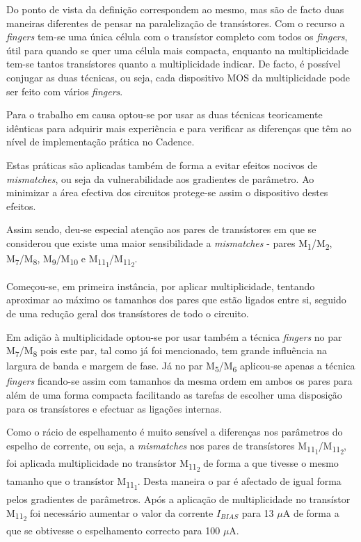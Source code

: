 \documentclass[11pt]{article}
\numberwithin{equation}{section}
\begin{document}
Do ponto de vista da definição correspondem ao mesmo, mas são de facto duas maneiras diferentes de pensar na paralelização de transístores. Com o recurso a \textit{fingers} tem-se uma única célula com o transístor completo com todos os \textit{fingers}, útil para quando se quer uma célula mais compacta, enquanto na multiplicidade tem-se tantos transístores quanto a multiplicidade indicar. De facto, é possível conjugar as duas técnicas, ou seja, cada dispositivo MOS da multiplicidade pode ser feito com vários \textit{fingers}.

Para o trabalho em causa optou-se por usar as duas técnicas teoricamente idênticas para adquirir mais experiência e para verificar as diferenças que têm ao nível de implementação prática no Cadence.

Estas práticas são aplicadas também de forma a evitar  efeitos nocivos de \textit{mismatches}, ou seja da vulnerabilidade aos gradientes de parâmetro. Ao minimizar a área efectiva dos circuitos protege-se assim o dispositivo destes efeitos.

Assim sendo, deu-se especial atenção aos pares de transístores em que se considerou que existe uma maior sensibilidade a \textit{mismatches} - pares M\textsubscript{1}/M\textsubscript{2}, M\textsubscript{7}/M\textsubscript{8}, M\textsubscript{9}/M\textsubscript{10} e M\textsubscript{11\textsubscript{1}}/M\textsubscript{11\textsubscript{2}}. 

Começou-se, em primeira instância, por aplicar multiplicidade, tentando aproximar ao máximo os tamanhos dos pares que estão ligados entre si, seguido de uma redução geral dos transístores de todo o circuito. 

Em adição à multiplicidade optou-se por usar também a técnica \textit{fingers} no par M\textsubscript{7}/M\textsubscript{8} pois este par, tal como já foi mencionado, tem grande influência na largura de banda e margem de fase. Já no par M\textsubscript{5}/M\textsubscript{6} aplicou-se apenas a técnica \textit{fingers} ficando-se assim com tamanhos da mesma ordem em ambos os pares para além de uma forma compacta facilitando as tarefas de escolher uma disposição para os transístores e efectuar as ligações internas.

Como o rácio de espelhamento é muito sensível a diferenças nos parâmetros do espelho de corrente, ou seja, a \textit{mismatches} nos pares de transístores M\textsubscript{11\textsubscript{1}}/M\textsubscript{11\textsubscript{2}}, foi aplicada multiplicidade no transístor M\textsubscript{11\textsubscript{2}} de forma a que tivesse o mesmo tamanho que o transístor M\textsubscript{11\textsubscript{1}}. Desta maneira o par é afectado de igual forma pelos gradientes de parâmetros. Após a aplicação de multiplicidade no transístor M\textsubscript{11\textsubscript{2}} foi necessário aumentar o valor da corrente $I_{BIAS}$ para 13 $\mu$A de forma a que se obtivesse o espelhamento correcto para 100 $\mu$A.
\end{document}
